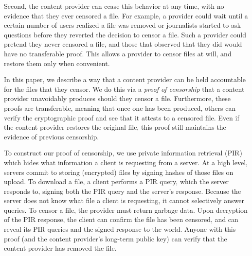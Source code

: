 Second, the content provider can cease this behavior at any time, with no
evidence that they ever censored a file. For example, a provider could wait
until a certain number of users realized a file was removed or journalists started
to ask questions before they reverted the decision to censor a file. Such a
provider could pretend they never censored a file, and those that observed that they
did would have no transferable proof. This allows a provider to censor
files at will, and restore them only when convenient.



\medskip

In this paper, we describe a way that a content provider can be held accountable
for the files that they censor. We do this via a \emph{proof of censorship} that
a content provider unavoidably produces should they censor a file. Furthermore,
these proofs are transferable, meaning that once one has been produced, others
can verify the cryptographic proof and see that it attests to a censored file.
Even if the content provider restores the original file, this proof still
maintains the evidence of previous censorship.

To construct our proof of censorship, we use
private information retrieval (PIR) which hides what information a client is
requesting from a server. At a high level, servers commit to storing (encrypted)
files by signing hashes of those files on upload. To download a file, a client
performs a PIR query, which the server responds to, signing both the PIR query
and the server's response. Because the server does not know what file a client
is requesting, it cannot selectively answer queries. To censor a file, the
provider must return garbage data. Upon decryption of the PIR response, the
client can confirm the file has been censored, and can reveal its PIR queries
and the signed response to the world. Anyone with this proof (and the content
provider's long-term public key) can verify that the content provider has
removed the file.


